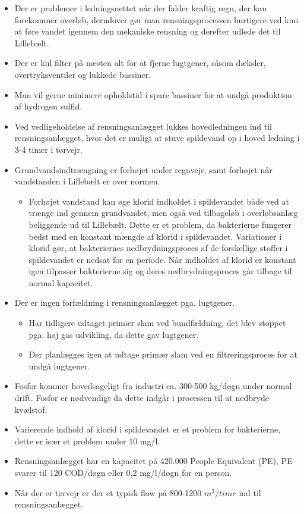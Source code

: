\begin{itemize}
	\item Der er problemer i ledningsnettet når der falder kraftig regn, der kan forekommer overløb, derudover gør man rensningsprocessen hurtigere ved kun at føre vandet igennem den mekaniske rensning og derefter udlede det til Lillebælt. 
	\item Der er kul filter på næsten alt for at fjerne lugtgener, såsom dæksler, overtryksventiler og lukkede bassiner. 
	\item Man vil gerne minimere opholdstid i spare bassiner for at undgå produktion af hydrogen sulfid. 
	\item Ved vedligeholdelse af rensningsanlægget lukkes hovedledningen ind til rensningsanlægget, hvor det er muligt at stuve spildevand op i hoved ledning i 3-4 timer i tørvejr.
	\item Grundvandsindtrængning er forhøjet under regnvejr, samt forhøjet når vandstanden i Lillebælt er over normen.
	\begin{itemize}
		\item Forhøjet vandstand kan øge klorid indholdet i spildevandet både ved at trænge ind gennem grundvandet, men også ved tilbageløb i overløbsanlæg beliggende ud til Lillebælt. Dette er et problem, da bakterierne fungerer bedst med en konstant mængde af klorid i spildevandet. Variationer i klorid gør, at bakteriernes nedbrydningsproces af de forskellige stoffer i spildevandet er nedsat for en periode. Når indholdet af klorid er konstant igen tilpasser bakterierne sig og deres nedbrydningsproces går tilbage til normal kapacitet.
	\end{itemize}
	\item Der er ingen forfældning i rensningsanlægget pga. lugtgener. 
	\begin{itemize}
		\item Har tidligere udtaget primær slam ved bundfældning, det blev stoppet pga. høj gas udvikling, da dette gav lugtgener.
		\item Der planlægges igen at udtage primær slam ved en filtreringsproces for at undgå lugtgener.
	\end{itemize}
	\item Fosfor kommer hovedsageligt fra industri ca. 300-500 kg/døgn under normal drift. Fosfor er nødvendigt da dette indgår i processen til at nedbryde kvælstof.
	\item Varierende indhold af klorid i spildevandet er et problem for bakterierne, dette er især et problem under 10 mg/l.
	\item Rensningsanlægget har en kapacitet på 420.000 People Equivalent (PE), PE svarer til 120 COD/døgn eller 0,2 mg/l/døgn for en person.
	\item Når der er tørvejr er der et typisk flow på 800-1200 $m^3/time$ ind til rensningsanlægget.
\end{itemize}
